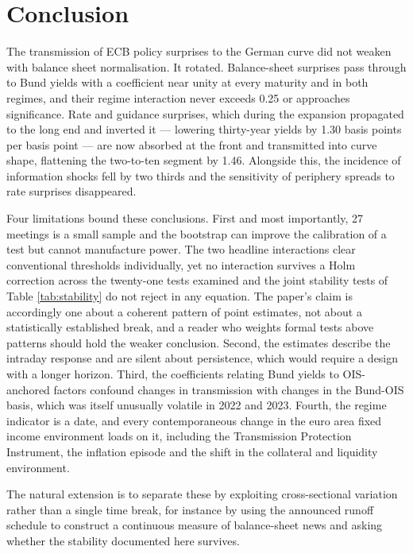 \documentclass[11pt]{article}
\begin{document}
\section{Conclusion}
\label{sec:conclusion}

The transmission of ECB policy surprises to the German curve did not weaken with
balance sheet normalisation. It rotated. Balance-sheet surprises pass through to Bund yields with a coefficient near unity at every maturity and in both regimes, and their regime interaction never exceeds 0.25 or approaches significance. Rate and guidance surprises, which during the expansion propagated to the long end and inverted it --- lowering thirty-year yields by 1.30 basis points per basis point --- are now absorbed at the front and transmitted into curve shape, flattening the two-to-ten segment by 1.46. Alongside this, the incidence of information shocks fell by two thirds and
the sensitivity of periphery spreads to rate surprises disappeared.

Four limitations bound these conclusions. First and most importantly, 27 meetings
is a small sample and the bootstrap can improve the calibration of a test but
cannot manufacture power. The two headline interactions clear conventional
thresholds individually, yet no interaction survives a Holm correction across
the twenty-one tests examined and the joint stability tests of Table
\ref{tab:stability} do not reject in any equation. The paper's claim is
accordingly one about a coherent pattern of point estimates, not about a
statistically established break, and a reader who weights formal tests above
patterns should hold the weaker conclusion. Second, the estimates describe the
intraday response and are silent about persistence, which would require a design
with a longer horizon. Third, the coefficients relating Bund yields to
OIS-anchored factors confound changes in transmission with changes in the
Bund-OIS basis, which was itself unusually volatile in 2022 and 2023. Fourth,
the regime indicator is a date, and every contemporaneous change in the euro area
fixed income environment loads on it, including the Transmission Protection
Instrument, the inflation episode and the shift in the collateral and liquidity
environment.

The natural extension is to separate these by exploiting cross-sectional
variation rather than a single time break, for instance by using the announced
runoff schedule to construct a continuous measure of balance-sheet news and
asking whether the stability documented here survives.
\end{document}
